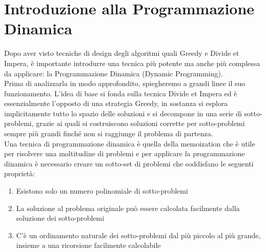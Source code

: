 \section{Introduzione alla Programmazione Dinamica}

Dopo aver visto tecniche di design degli algoritmi quali Greedy e Divide et
Impera, è importante introdurre una tecnica più potente ma anche più complessa
da applicare: la Programmazione Dinamica (Dynamic Programming).\\

Prima di analizzarla in modo approfondito, spiegheremo a grandi linee il suo
funzionamento. L'idea di base si fonda sulla tecnica Divide et Impera ed è
essenzialmente l'opposto di una strategia Greedy, in sostanza si esplora
implicitamente tutto lo spazio delle soluzioni e si decompone in una serie di
sotto-problemi, grazie ai quali si costruiscono soluzioni corrette per
sotto-problemi sempre più grandi finché non si raggiunge il problema di
partenza.\\
\- Una tecnica di programmazione dinamica è quella della memoization che è utile
per risolvere una moltitudine di problemi e per applicare la programmazione
dinamica è necessario creare un sotto-set di problemi che soddisfano le seguenti
proprietà:

\begin{enumerate}
      \item Esistono solo un numero polinomiale di sotto-problemi
      \item La soluzione al
            problema originale può essere calcolata facilmente dalla soluzione dei
            sotto-problemi
      \item C'è un ordinamento naturale dei sotto-problemi dal più piccolo
            al più grande, insieme a una ricorsione facilmente calcolabile
\end{enumerate}

